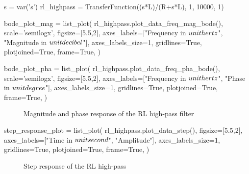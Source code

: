 \begin{sagesilent}
    s = var('s')
    rl_highpass = TransferFunction((s*L)/(R+s*L), 1, 10000, 1)

    bode_plot_mag = list_plot(
        rl_highpass.plot_data_freq_mag_bode(),
        scale='semilogx',
        figsize=[5.5,2],
        axes_labels=["Frequency in $\\unit{\\hertz}$", "Magnitude in $\\unit{\\decibel}$"],
        axes_labels_size=1,
        gridlines=True,
        plotjoined=True,
        frame=True,
    )

    bode_plot_pha = list_plot(
        rl_highpass.plot_data_freq_pha_bode(),
        scale='semilogx',
        figsize=[5.5,2],
        axes_labels=["Frequency in $\\unit{\\hertz}$", "Phase in $\\unit{\\degree}$"],
        axes_labels_size=1,
        gridlines=True,
        plotjoined=True,
        frame=True,
    )
\end{sagesilent}

\begin{figure}[H]
    \centering
    \begin{subfigure}{\textwidth}
        \centering
    \end{subfigure}
    \quad
    \begin{subfigure}{\textwidth}
        \centering
    \end{subfigure}
    \caption{Magnitude and phase response of the RL high-pass filter}
\end{figure}

\begin{sagesilent}
    step_response_plot = list_plot(
        rl_highpass.plot_data_step(),
        figsize=[5.5,2],
        axes_labels=["Time in $\\unit{\\second}$", "Amplitude"],
        axes_labels_size=1,
        gridlines=True,
        plotjoined=True,
        frame=True,
    )
\end{sagesilent}

\begin{figure}[H]
    \centering
    \caption{Step response of the RL high-pass}
\end{figure}

